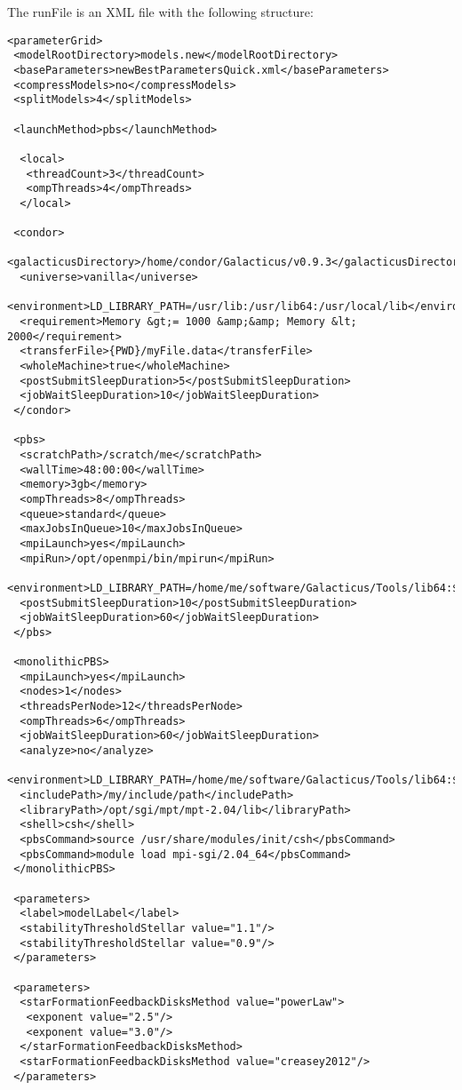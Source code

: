 The {\normalfont \ttfamily runFile} is an XML file with the following structure:
\begin{verbatim}
<parameterGrid>
 <modelRootDirectory>models.new</modelRootDirectory>
 <baseParameters>newBestParametersQuick.xml</baseParameters>
 <compressModels>no</compressModels>
 <splitModels>4</splitModels>

 <launchMethod>pbs</launchMethod>

  <local>
   <threadCount>3</threadCount>
   <ompThreads>4</ompThreads>
  </local>

 <condor>
  <galacticusDirectory>/home/condor/Galacticus/v0.9.3</galacticusDirectory>
  <universe>vanilla</universe>
  <environment>LD_LIBRARY_PATH=/usr/lib:/usr/lib64:/usr/local/lib</environment>
  <requirement>Memory &gt;= 1000 &amp;&amp; Memory &lt; 2000</requirement>
  <transferFile>{PWD}/myFile.data</transferFile>
  <wholeMachine>true</wholeMachine>
  <postSubmitSleepDuration>5</postSubmitSleepDuration>
  <jobWaitSleepDuration>10</jobWaitSleepDuration>
 </condor>

 <pbs>
  <scratchPath>/scratch/me</scratchPath>
  <wallTime>48:00:00</wallTime>
  <memory>3gb</memory>
  <ompThreads>8</ompThreads>
  <queue>standard</queue>
  <maxJobsInQueue>10</maxJobsInQueue>
  <mpiLaunch>yes</mpiLaunch>
  <mpiRun>/opt/openmpi/bin/mpirun</mpiRun>
  <environment>LD_LIBRARY_PATH=/home/me/software/Galacticus/Tools/lib64:$LD_LIBRARY_PATH</environment>
  <postSubmitSleepDuration>10</postSubmitSleepDuration>
  <jobWaitSleepDuration>60</jobWaitSleepDuration>
 </pbs>

 <monolithicPBS>
  <mpiLaunch>yes</mpiLaunch>
  <nodes>1</nodes>
  <threadsPerNode>12</threadsPerNode>
  <ompThreads>6</ompThreads>
  <jobWaitSleepDuration>60</jobWaitSleepDuration>
  <analyze>no</analyze>
  <environment>LD_LIBRARY_PATH=/home/me/software/Galacticus/Tools/lib64:$LD_LIBRARY_PATH</environment>
  <includePath>/my/include/path</includePath>
  <libraryPath>/opt/sgi/mpt/mpt-2.04/lib</libraryPath>
  <shell>csh</shell>
  <pbsCommand>source /usr/share/modules/init/csh</pbsCommand>
  <pbsCommand>module load mpi-sgi/2.04_64</pbsCommand>
 </monolithicPBS>
                  
 <parameters>
  <label>modelLabel</label>
  <stabilityThresholdStellar value="1.1"/>
  <stabilityThresholdStellar value="0.9"/>
 </parameters>

 <parameters>
  <starFormationFeedbackDisksMethod value="powerLaw">
   <exponent value="2.5"/>
   <exponent value="3.0"/>
  </starFormationFeedbackDisksMethod>
  <starFormationFeedbackDisksMethod value="creasey2012"/>
 </parameters>


\end{verbatim}
